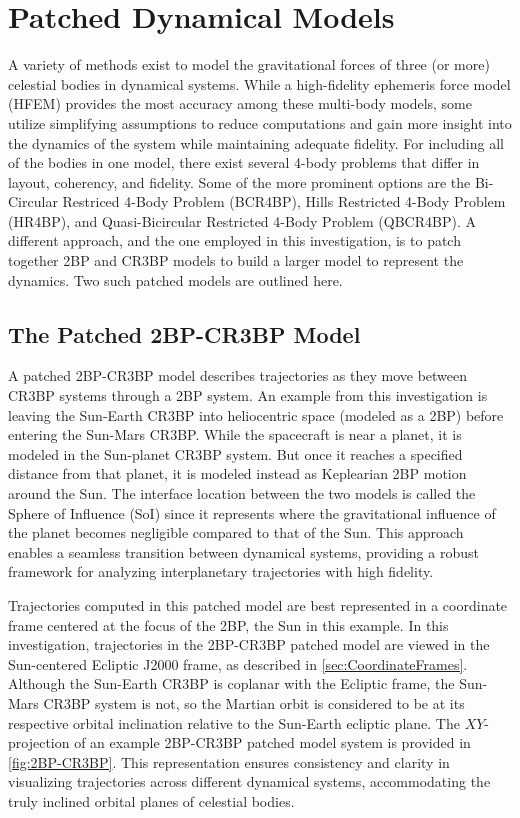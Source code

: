 \section{Patched Dynamical Models}\label{sec:PatchedModels}
A variety of methods exist to model the gravitational forces of three (or more) celestial bodies in
dynamical systems. While a high-fidelity ephemeris force model (HFEM) provides the most accuracy
among these multi-body models, some utilize simplifying assumptions to reduce computations and gain
more insight into the dynamics of the system while maintaining adequate fidelity. For including all
of the bodies in one model, there exist several 4-body problems that differ in layout, coherency,
and fidelity. Some of the more prominent options are the Bi-Circular Restriced 4-Body Problem
(BCR4BP)\cite{Boudad:2018}, Hills Restricted 4-Body Problem (HR4BP)\cite{Scheeres:1998}, and
Quasi-Bicircular Restricted 4-Body Problem (QBCR4BP)\cite{Andreu:2002}. A different approach, and
the one employed in this investigation, is to patch together 2BP and CR3BP models to build a larger
model to represent the dynamics. Two such patched models are outlined here.

\subsection{The Patched 2BP-CR3BP Model}
A patched 2BP-CR3BP model describes trajectories as they move between CR3BP systems through a 2BP
system. An example from this investigation is leaving the Sun-Earth CR3BP into heliocentric space
(modeled as a 2BP) before entering the Sun-Mars CR3BP. While the spacecraft is near a planet, it is
modeled in the Sun-planet CR3BP system. But once it reaches a specified distance from that planet,
it is modeled instead as Keplearian 2BP motion around the Sun\cite{Canales:2021b}. The interface
location between the two models is called the Sphere of Influence (SoI) since it represents where
the gravitational influence of the planet becomes negligible compared to that of the Sun. This
approach enables a seamless transition between dynamical systems, providing a robust framework for
analyzing interplanetary trajectories with high fidelity.

Trajectories computed in this patched model are best represented in a coordinate frame centered at
the focus of the 2BP, the Sun in this example. In this investigation, trajectories in the 2BP-CR3BP
patched model are viewed in the Sun-centered Ecliptic J2000 frame, as described in
\cref{sec:CoordinateFrames}. Although the Sun-Earth CR3BP is coplanar with the Ecliptic frame, the
Sun-Mars CR3BP system is not, so the Martian orbit is considered to be at its respective orbital
inclination relative to the Sun-Earth ecliptic plane. The $XY$-projection of an example 2BP-CR3BP
patched model system is provided in \cref{fig:2BP-CR3BP}. This representation ensures consistency
and clarity in visualizing trajectories across different dynamical systems, accommodating the truly
inclined orbital planes of celestial bodies.

